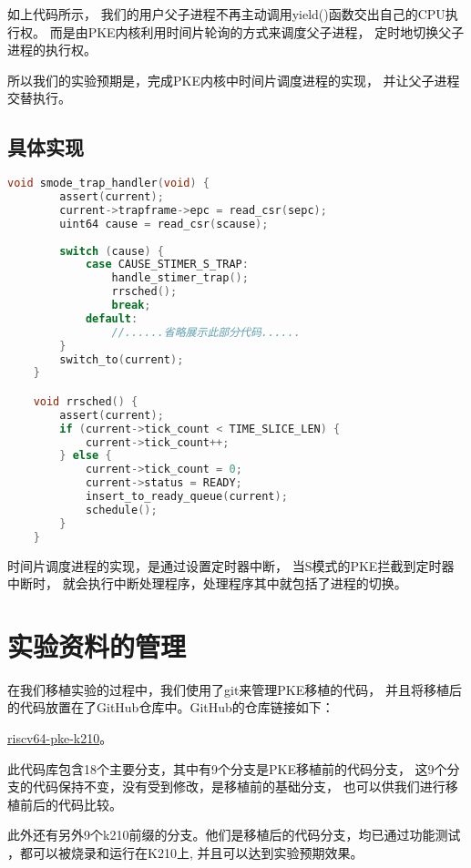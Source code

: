 如上代码所示，
我们的用户父子进程不再主动调用yield()函数交出自己的CPU执行权。
而是由PKE内核利用时间片轮询的方式来调度父子进程，
定时地切换父子进程的执行权。

所以我们的实验预期是，完成PKE内核中时间片调度进程的实现，
并让父子进程交替执行。

\subsection{具体实现}

\begin{lstlisting}[caption={时间片调度}, label={lst:time_slice}, language=C]
    void smode_trap_handler(void) {
        assert(current);
        current->trapframe->epc = read_csr(sepc);
        uint64 cause = read_csr(scause);
    
        switch (cause) {
            case CAUSE_STIMER_S_TRAP:
                handle_stimer_trap();
                rrsched();
                break;
            default:
                //......省略展示此部分代码......
        }
        switch_to(current);
    }

    void rrsched() {
        assert(current);
        if (current->tick_count < TIME_SLICE_LEN) {
            current->tick_count++;
        } else {
            current->tick_count = 0;
            current->status = READY;
            insert_to_ready_queue(current);
            schedule();
        }
    }    
\end{lstlisting}

时间片调度进程的实现，是通过设置定时器中断，
当S模式的PKE拦截到定时器中断时，
就会执行中断处理程序，处理程序其中就包括了进程的切换。

\section{实验资料的管理}

在我们移植实验的过程中，我们使用了git来管理PKE移植的代码，
并且将移植后的代码放置在了GitHub仓库中。GitHub的仓库链接如下：

\href{https://github.com/BITzga/riscv64-pke-k210}{riscv64-pke-k210}。

此代码库包含18个主要分支，其中有9个分支是PKE移植前的代码分支，
这9个分支的代码保持不变，没有受到修改，是移植前的基础分支，
也可以供我们进行移植前后的代码比较。

此外还有另外9个k210前缀的分支。他们是移植后的代码分支，均已通过功能测试
，都可以被烧录和运行在K210上, 并且可以达到实验预期效果。

